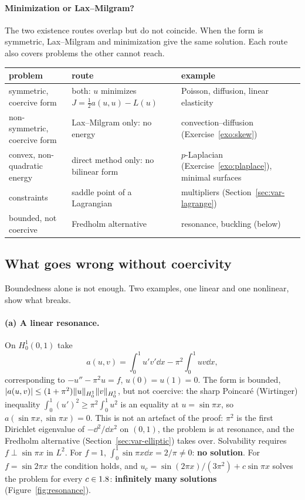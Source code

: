 \paragraph{Minimization or Lax--Milgram?}
%
The two existence routes overlap but do not coincide. When the form is
symmetric, Lax--Milgram and minimization give the same solution. Each route
also covers problems the other cannot reach.
\begin{center}\small
\renewcommand{\arraystretch}{1.2}
\begin{tabular}{@{}>{\raggedright\arraybackslash}p{4.2cm}>{\raggedright\arraybackslash}p{4.6cm}>{\raggedright\arraybackslash}p{5.4cm}@{}}
\toprule
problem & route & example\\
\midrule
symmetric, coercive form & both: $u$ minimizes $J=\tfrac12a(u,u)-L(u)$ & Poisson, diffusion, linear elasticity\\
non-symmetric, coercive form & Lax--Milgram only: no energy & convection--diffusion (Exercise~\ref{exo:skew})\\
convex, non-quadratic energy & direct method only: no bilinear form & $p$-Laplacian (Exercise~\ref{exo:plaplace}), minimal surfaces\\
constraints & saddle point of a Lagrangian & multipliers (Section~\ref{sec:var-lagrange})\\
bounded, not coercive & Fredholm alternative & resonance, buckling (below)\\
\bottomrule
\end{tabular}
\end{center}

\subsection*{What goes wrong without coercivity}
Boundedness alone is not enough. Two examples, one linear and one nonlinear,
show what breaks.

\paragraph{(a) A linear resonance.} On $H^1_0(0,1)$ take
%
\[
  a(u,v)=\int_0^1u'v'\dd x-\pi^2\int_0^1uv\dd x,
\]
corresponding to $-u''-\pi^2u=f$, $u(0)=u(1)=0$. The form is bounded,
$|a(u,v)|\le(1+\pi^2)\lVert u\rVert_{H^1_0}\lVert v\rVert_{H^1_0}$, but not coercive: the
sharp Poincar\'e (Wirtinger) inequality $\displaystyle \int_0^1(u')^2\ge\pi^2\int_0^1u^2$ is
an equality at $u=\sin\pi x$, so $a(\sin\pi x,\sin\pi x)=0$. This is not an
artefact of the proof: $\pi^2$ is the first Dirichlet eigenvalue of
$-\dd^2/\dd x^2$ on $(0,1)$, the problem is at resonance, and the Fredholm
alternative (Section~\ref{sec:var-elliptic}) takes over. Solvability requires
$f\perp\sin\pi x$ in $L^2$. For $f=1$, $\displaystyle \int_0^1\sin\pi x\dd x=2/\pi\neq0$:
\textbf{no solution}. For $f=\sin2\pi x$ the condition holds, and
$u_c=\sin(2\pi x)/(3\pi^2)+c\sin\pi x$ solves the problem for every
$c\in1.8$: \textbf{infinitely many solutions} (Figure~\ref{fig:resonance}).

